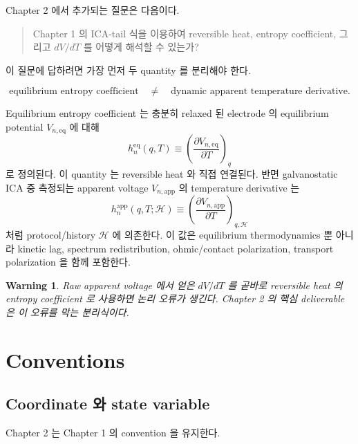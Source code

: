 \documentclass[11pt,a4paper]{article}
\newtheorem*{warningbox}{Warning}
\newcommand{\eqs}{\mathrm{eq}}
\newcommand{\app}{\mathrm{app}}
\newcommand{\calH}{\mathcal H}
\begin{document}
Chapter 2 에서 추가되는 질문은 다음이다.

\begin{quote}
Chapter 1 의 ICA-tail 식을 이용하여 reversible heat, entropy coefficient, 그리고
\(dV/dT\) 를 어떻게 해석할 수 있는가?
\end{quote}

이 질문에 답하려면 가장 먼저 두 quantity 를 분리해야 한다.

\[
\text{equilibrium entropy coefficient}
\quad\ne\quad
\text{dynamic apparent temperature derivative}.
\]

Equilibrium entropy coefficient 는 충분히 relaxed 된 electrode 의 equilibrium potential
\(V_{n,\eqs}\) 에 대해
\[
h_n^{\eqs}(q,T)
\equiv
\left(\frac{\partial V_{n,\eqs}}{\partial T}\right)_q
\]
로 정의된다. 이 quantity 는 reversible heat 와 직접 연결된다. 반면 galvanostatic ICA 중
측정되는 apparent voltage \(V_{n,\app}\) 의 temperature derivative 는
\[
h_n^{\app}(q,T;\calH)
\equiv
\left(\frac{\partial V_{n,\app}}{\partial T}\right)_{q,\calH}
\]
처럼 protocol/history \(\calH\) 에 의존한다. 이 값은 equilibrium thermodynamics 뿐 아니라
kinetic lag, spectrum redistribution, ohmic/contact polarization, transport polarization 을 함께 포함한다.

\begin{warningbox}
Raw apparent voltage 에서 얻은 \(dV/dT\) 를 곧바로 reversible heat 의 entropy coefficient 로
사용하면 논리 오류가 생긴다. Chapter 2 의 핵심 deliverable 은 이 오류를 막는 분리식이다.
\end{warningbox}

\section{Conventions}\label{sec:conventions}

\subsection{Coordinate 와 state variable}\label{sec:coordinate}

Chapter 2 는 Chapter 1 의 convention 을 유지한다.
\end{document}
